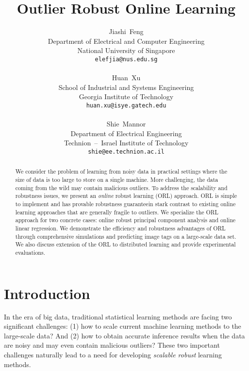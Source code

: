 \documentclass[11pt]{article}
\title{Outlier Robust Online  Learning}
\date{}
\author{
	Jiashi~Feng
	\\
	Department of Electrical and Computer Engineering\\
	National University of Singapore\\
	\texttt{elefjia@nus.edu.sg} \\ \\
	Huan~Xu \\
	School of Industrial and Systems Engineering \\
	Georgia Institute of Technology \\ 
	\texttt{huan.xu@isye.gatech.edu} \\\\
	Shie~Mannor\\
	Department of Electrical Engineering\\
	Technion~--~Israel Institute of Technology\\
	\texttt{shie@ee.technion.ac.il} 
}
\begin{document}
\maketitle



\begin{abstract}
	We consider  the  problem of learning from noisy data in practical settings where the size of data is too large to store on a single machine. More challenging, the data coming from the wild may contain malicious outliers. To address the scalability and robustness issues, we present an \emph{online} robust  learning (ORL)  approach. ORL is simple to implement and has provable  robustness guarantee\textemdash in stark contrast to existing online learning approaches that are generally fragile to outliers. We  specialize the  ORL approach for two concrete cases: online robust principal component analysis and online  linear regression. We demonstrate the efficiency and  robustness advantages of  ORL through comprehensive simulations and predicting image tags on a large-scale data set. We also discuss  extension of the ORL to distributed learning and provide experimental evaluations.
\end{abstract}






\section{Introduction}
\label{sec:introduction}

% 
% 
% 
% 
In the  era of big data, traditional statistical learning  methods are facing two  significant challenges: (1) how to scale   current machine learning methods to the large-scale data? And (2) how to obtain accurate inference results when the data are noisy and may even contain malicious outliers? These two important challenges naturally lead to a need for  developing   \emph{scalable robust} learning methods.
\end{document}
